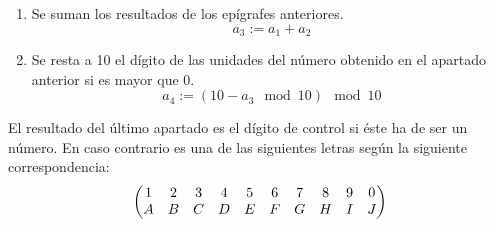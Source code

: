 \begin{itemize}
\begin{enumerate}
			\item Se suman los resultados de los epígrafes anteriores.
				\begin{equation*}
					a_3 := a_1 + a_2
				\end{equation*}
			\item Se resta a 10 el dígito de las unidades del número obtenido en el apartado anterior si es mayor que 0.
				\begin{equation*}
					a_4 := (10 - a_3 \mod 10) \mod 10
				\end{equation*}
		\end{enumerate}


	El resultado del último apartado es el dígito de control si éste ha de ser un número. En caso contrario es una de las siguientes letras según la siguiente correspondencia:
		{\small
		\begin{equation*}
			\setcounter{MaxMatrixCols}{10}
			\begin{pmatrix}
				1 & 2 & 3 & 4 & 5 & 6 & 7 & 8 & 9 & 0 \\
				A & B & C & D & E & F & G & H & I & J
			\end{pmatrix}
		\end{equation*}
		}
\end{itemize}
